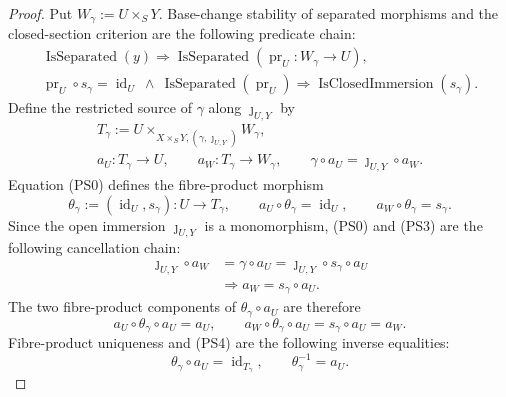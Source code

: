\begin{proof}
  Put $W_\gamma:=U\times_SY$.  Base-change stability of separated
  morphisms and the closed-section criterion are the following predicate
  chain:
  \[
  \begin{gathered}
    \operatorname{IsSeparated}(y)
      \Longrightarrow\operatorname{IsSeparated}
        (\operatorname{pr}_U\colon W_\gamma\to U),\\
    \operatorname{pr}_U\circ s_\gamma=\operatorname{id}_U
      \ \wedge\
      \operatorname{IsSeparated}(\operatorname{pr}_U)
      \Longrightarrow\operatorname{IsClosedImmersion}(s_\gamma). 
  \end{gathered} \tag{PS2}
  \]
  Define the restricted source of $\gamma$ along $\jmath_{U,Y}$ by
  \[
  \begin{gathered}
    T_\gamma:=
      U\times_{X\times_SY,(\gamma,\jmath_{U,Y})}W_\gamma,\\
    a_U\colon T_\gamma\to U,\qquad
    a_W\colon T_\gamma\to W_\gamma,\qquad
    \gamma\circ a_U=\jmath_{U,Y}\circ a_W.                    
  \end{gathered} \tag{PS3}
  \]
  Equation (PS0) defines the fibre-product morphism
  \[
    \theta_\gamma:=(\operatorname{id}_U,s_\gamma)
      \colon U\longrightarrow T_\gamma,\qquad
    a_U\circ\theta_\gamma=\operatorname{id}_U,\qquad
    a_W\circ\theta_\gamma=s_\gamma.                            \tag{PS4}
  \]
  Since the open immersion $\jmath_{U,Y}$ is a monomorphism, (PS0) and
  (PS3) are the following cancellation chain:
  \[
  \begin{aligned}
    \jmath_{U,Y}\circ a_W
      &=\gamma\circ a_U
       =\jmath_{U,Y}\circ s_\gamma\circ a_U\\
    &\Longrightarrow a_W=s_\gamma\circ a_U.
  \end{aligned}                                                  \tag{PS5}
  \]
  The two fibre-product components of $\theta_\gamma\circ a_U$ are therefore
  \[
    a_U\circ\theta_\gamma\circ a_U=a_U,
    \qquad
    a_W\circ\theta_\gamma\circ a_U
      =s_\gamma\circ a_U=a_W.
  \]
  Fibre-product uniqueness and (PS4) are the following inverse equalities:
  \[
    \theta_\gamma\circ a_U=\operatorname{id}_{T_\gamma},\qquad
    \theta_\gamma^{-1}=a_U.                                    \tag{PS6}
  \]


\end{proof}
